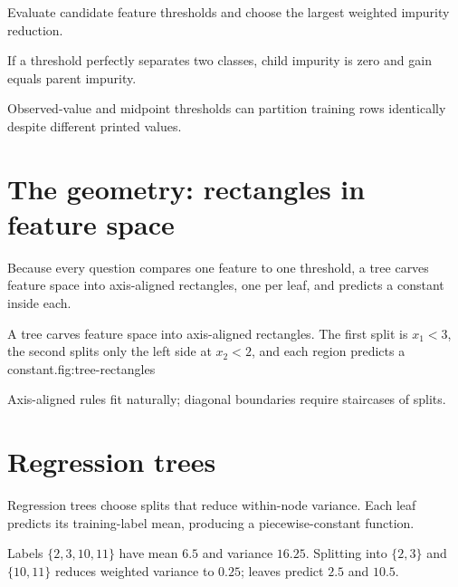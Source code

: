 Evaluate candidate feature thresholds and choose the largest weighted impurity reduction.

If a threshold perfectly separates two classes, child impurity is zero and gain equals parent impurity.

\begin{libnote}
Observed-value and midpoint thresholds can partition training rows identically despite different printed values.
\end{libnote}

\section{The geometry: rectangles in feature space}

Because every question compares one feature to one threshold, a tree carves feature space into axis-aligned rectangles, one per leaf, and predicts a constant inside each.

\begin{utpfig}{A tree carves feature space into axis-aligned rectangles. The first split is $x_1<3$, the second splits only the left side at $x_2<2$, and each region predicts a constant.}{fig:tree-rectangles}
\end{utpfig}

Axis-aligned rules fit naturally; diagonal boundaries require staircases of splits.

\section{Regression trees}

Regression trees choose splits that reduce within-node variance. Each leaf predicts its training-label mean, producing a piecewise-constant function.

\begin{workedexample}
Labels $\{2,3,10,11\}$ have mean $6.5$ and variance $16.25$. Splitting into $\{2,3\}$ and $\{10,11\}$ reduces weighted variance to $0.25$; leaves predict $2.5$ and $10.5$.
\end{workedexample}

